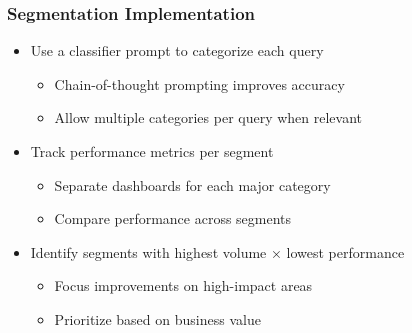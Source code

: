 {    \begin{frame}
        \frametitle{Segmentation Implementation}
        \begin{itemize}
            \item Use a classifier prompt to categorize each query
            \begin{itemize}
                \item Chain-of-thought prompting improves accuracy
                \item Allow multiple categories per query when relevant
            \end{itemize}
            \item Track performance metrics per segment
            \begin{itemize}
                \item Separate dashboards for each major category
                \item Compare performance across segments
            \end{itemize}
            \item Identify segments with highest volume × lowest performance
            \begin{itemize}
                \item Focus improvements on high-impact areas
                \item Prioritize based on business value
            \end{itemize}
        \end{itemize}
    \end{frame}

}
